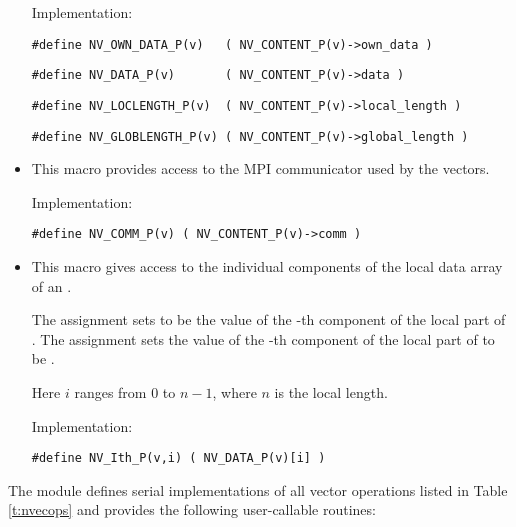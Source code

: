 \begin{itemize}
  Implementation:
  
  \verb|#define NV_OWN_DATA_P(v)   ( NV_CONTENT_P(v)->own_data )|

  \verb|#define NV_DATA_P(v)       ( NV_CONTENT_P(v)->data )|

  \verb|#define NV_LOCLENGTH_P(v)  ( NV_CONTENT_P(v)->local_length )|

  \verb|#define NV_GLOBLENGTH_P(v) ( NV_CONTENT_P(v)->global_length )|
  
\item {}

  This macro provides access to the MPI communicator used by the {\nvecp}
  vectors.

  Implementation:

  \verb|#define NV_COMM_P(v) ( NV_CONTENT_P(v)->comm )|

\item {}

  This macro gives access to the individual components of the local data
  array of an .

  The assignment  sets  to be the value of 
  the -th component of the local part of . 
  The assignment    
  sets the value of the -th component of the local part of  
  to be .        
  
  Here $i$ ranges from $0$ to $n-1$, where $n$ is the local length.
      
  Implementation:

  \verb|#define NV_Ith_P(v,i) ( NV_DATA_P(v)[i] )|

\end{itemize}
The {\nvecp} module defines serial implementations of all vector operations listed 
in Table \ref{t:nvecops} and provides the following user-callable routines:
